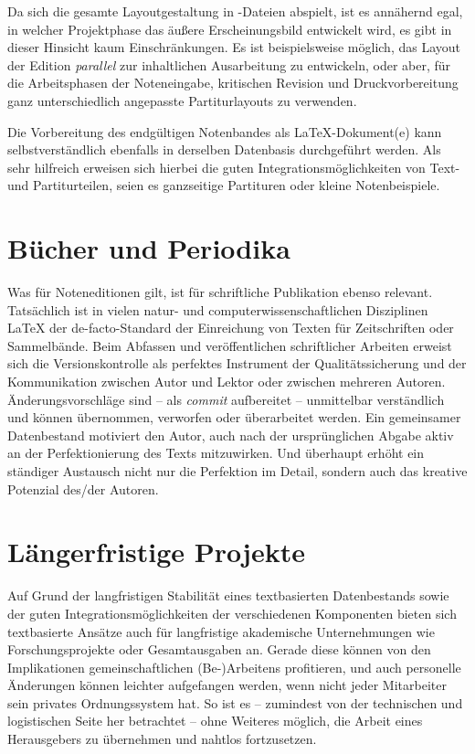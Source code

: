 \documentclass[DIV=12]{scrreprt}
\begin{document}
Da sich die gesamte Layoutgestaltung in -Dateien abspielt, ist es annähernd egal, in welcher Projektphase das äußere Erscheinungsbild entwickelt wird, es gibt in dieser Hinsicht kaum Einschränkungen.
Es ist beispielsweise möglich, das Layout der Edition \emph{parallel} zur inhaltlichen Ausarbeitung zu entwickeln, oder aber, für die Arbeitsphasen der Noteneingabe, kritischen Revision und Druckvorbereitung ganz unterschiedlich angepasste Partiturlayouts zu verwenden.

Die Vorbereitung des endgültigen Notenbandes als LaTeX-Dokument(e) kann selbstverständlich ebenfalls in derselben Datenbasis durchgeführt werden.
Als sehr hilfreich erweisen sich hierbei die guten Integrationsmöglichkeiten von Text- und Partiturteilen, seien es ganzseitige Partituren oder kleine Notenbeispiele.

\section{Bücher und Periodika}
\label{sec:pt_books-periodicals}
Was für Noteneditionen gilt, ist für schriftliche Publikation ebenso relevant.
Tatsächlich ist in vielen natur- und computerwissenschaftlichen Disziplinen \LaTeX{} der de-facto-Standard der Einreichung von Texten für Zeitschriften oder Sammelbände.
Beim Abfassen und veröffentlichen schriftlicher Arbeiten erweist sich die Versionskontrolle als perfektes Instrument der Qualitätssicherung und der Kommunikation zwischen Autor und Lektor oder zwischen mehreren Autoren.
Änderungsvorschläge sind -- als \emph{commit} aufbereitet -- unmittelbar verständlich und können übernommen, verworfen oder überarbeitet werden.
Ein gemeinsamer Datenbestand motiviert den Autor, auch nach der ursprünglichen Abgabe aktiv an der Perfektionierung des Texts mitzuwirken.
Und überhaupt erhöht ein ständiger Austausch nicht nur die Perfektion im Detail, sondern auch das kreative Potenzial des/der Autoren.

\section{Längerfristige Projekte}
\label{sec:pt_longrunning-projects}
Auf Grund der langfristigen Stabilität eines textbasierten Datenbestands sowie der guten Integrationsmöglichkeiten der verschiedenen Komponenten bieten sich textbasierte Ansätze auch für langfristige akademische Unternehmungen wie Forschungsprojekte oder Gesamtausgaben an.
Gerade diese können von den Implikationen gemeinschaftlichen (Be-)Arbeitens profitieren, und auch personelle Änderungen können leichter aufgefangen werden, wenn nicht jeder Mitarbeiter sein privates Ordnungssystem hat.
So ist es -- zumindest von der technischen und logistischen Seite her betrachtet -- ohne Weiteres möglich, die Arbeit eines Herausgebers zu übernehmen und nahtlos fortzusetzen.
\end{document}
